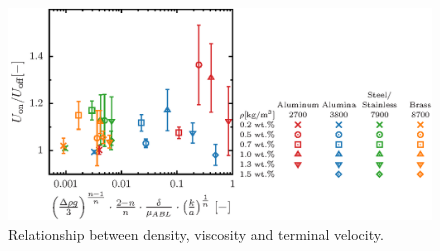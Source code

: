 \begin{figure}[ht]
    \centering
    \includegraphics[width=1.0\textwidth]{./5-Results/concentrationUdiffAll.eps}
    \caption{Relationship between density, viscosity and terminal velocity.}
    \label{fig:concentrationUdiffAll}
\end{figure}